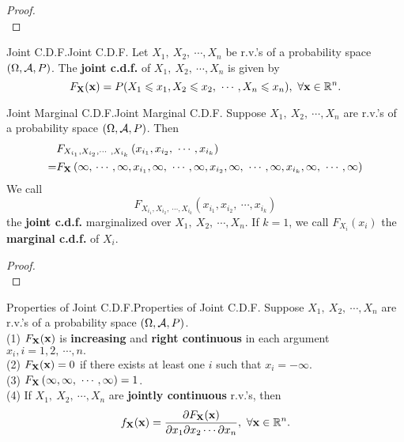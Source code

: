 \documentclass{elegantbook}
\begin{document}
\begin{proof}
\\[4cm]\vspace{0.01cm}
\end{proof}

\begin{definition}{Joint C.D.F.}{Joint C.D.F.}
Let \(X_{1},\ X_{2},\ \cdots,X_{n}\) be r.v.'s of a probability space $(\Omega,\mathcal{A}, P)$. The \textbf{joint c.d.f.} of \(X_{1},\ X_{2},\ \cdots,X_{n}\) is given by
\[F_{\mathbf{X}}(\mathbf{x}) = P( X_{1} \leqslant x_{1},X_{2} \leqslant x_{2},\ \cdots,X_{n} \leqslant x_{n}),\ \forall\mathbf{x} \in \mathbb{R}^{n}.\]
\end{definition}

\begin{theorem}{Joint Marginal C.D.F.}{Joint Marginal C.D.F.}
Suppose \(X_{1},\ X_{2},\ \cdots,X_{n}\) are r.v.'s of a probability space $(\Omega,\mathcal{A}, P)$. Then
\[\begin{aligned}
&F_{X_{i_{1}},X_{i_{2}},\cdots\ ,X_{i_{k}}}\left( x_{i_{1}},x_{i_{2}},\ \cdots,x_{i_{k}} \right) \\
=& F_{\mX}\left( \infty,\, \cdots,\infty,x_{i_{1}},\infty,\ \cdots,\infty,x_{i_{2}},\infty,\ \cdots,\infty,x_{i_{k}},\infty,\ \cdots,\infty \right)
\end{aligned}\]
We call \[F_{X_{i_{1}},X_{i_{2}},\ \cdots,X_{i_{k}}}\left( x_{i_{1}},x_{i_{2}},\ \cdots,x_{i_{k}} \right)\] the \textbf{joint c.d.f.} marginalized over \(X_{1},\ X_{2},\ \cdots,X_{n}\). If \(k = 1\), we call \(F_{X_{i}}(x_{i})\) the \textbf{marginal c.d.f.} of \(X_{i}\).
\end{theorem}

\begin{proof}
\\[4cm]\vspace{0.01cm}
\end{proof}

\begin{theorem}{Properties of Joint C.D.F.}{Properties of Joint C.D.F.}
Suppose \(X_{1},\ X_{2},\ \cdots,X_{n}\) are r.v.'s of a probability
space $(\Omega,\mathcal{A}, P)$.\\
(1) \(F_{\mathbf{X}}(\mathbf{x})\) is \textbf{increasing} and \textbf{right
continuous} in each argument \(x_{i},i = 1,2,\ \cdots,n.\)\\
(2) \(F_{\mathbf{X}}(\mathbf{x}) = 0\) if there exists at least one \(i\) such
that \(x_{i} = - \infty\).\\
(3) \(F_{\mX}\left( \infty,\infty,\ \cdots,\infty \right) = 1\).\\
(4) If \(X_{1},\ X_{2},\ \cdots,X_{n}\) are \textbf{jointly continuous}
r.v.'s, then
\[f_{\mX}(\mx) = \frac{\partial F_{\mX}(\mx)}{\partial x_{1}\partial x_{2}\cdots\partial x_{n}},\ \forall\mx \in \mathbb{R}^{n}.\]
\end{theorem}
\end{document}
